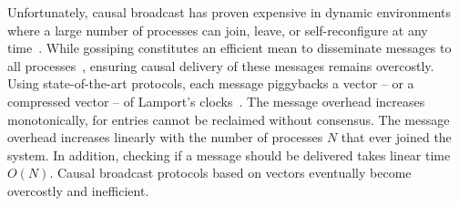 
Unfortunately, causal broadcast has proven expensive in dynamic environments
where a large number of processes can join, leave, or self-reconfigure at any
time~\cite{charronbost1991concerning}. While gossiping constitutes an efficient
mean to disseminate messages to all
processes~\cite{birman1999bimodal,demers1987epidemic}, ensuring causal delivery
of these messages remains overcostly.  Using state-of-the-art protocols, each
message piggybacks a vector -- or a compressed vector -- of Lamport's
clocks~\cite{almeida2008interval,fidge1988timestamps,mattern1989virtual,singhal1992efficient}.
The message overhead increases monotonically, for entries cannot be reclaimed
without consensus. The message overhead increases linearly with the number of
processes $N$ that ever joined the system.  In addition, checking if a message
should be delivered takes linear time $O(N)$. Causal broadcast protocols based
on vectors eventually become overcostly and inefficient.


